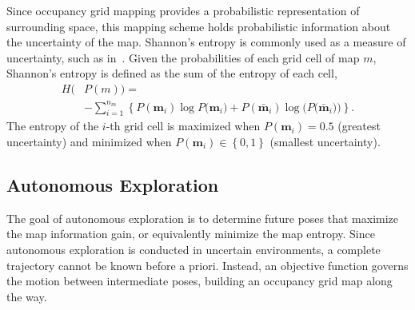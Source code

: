 \documentclass[letterpaper, 10pt, conference]{ieeeconf}
\newcommand{\braces}[1]{\ensuremath{\left\{ #1 \right\}}}
\begin{document}
Since occupancy grid mapping provides a probabilistic representation of surrounding space, this mapping scheme holds probabilistic information about the uncertainty of the map. Shannon's entropy is commonly used as a measure of uncertainty, such as in~\cite{StaGriBur05}. Given the probabilities of each grid cell of map $m$, Shannon's entropy is defined as the sum of the entropy of each cell,
\begin{align}
\label{eqn:ShannonsEntropyDef}
H(&P(m))=\nonumber\\&-\sum_{i=1}^{n_m}\braces{
P(\mathbf{m}_i)\log{P(\mathbf{m}_i})+P(\bar{\mathbf{m}}_i)\log{(P(\bar{\mathbf{m}}_i}))}.
\end{align}
The entropy of the $i$-th grid cell is maximized when $P(\mathbf{m}_i)=0.5$ (greatest uncertainty) and minimized when $P(\mathbf{m}_i)\in\braces{0,1}$ (smallest uncertainty). %


\subsection{Autonomous Exploration}

The goal of autonomous exploration is to determine future poses that maximize the map information gain, or equivalently minimize the map entropy. 
Since autonomous exploration is conducted in uncertain environments, a complete trajectory cannot be known before a priori.
Instead, an objective function governs the motion between intermediate poses, building an occupancy grid map along the way.
\end{document}
